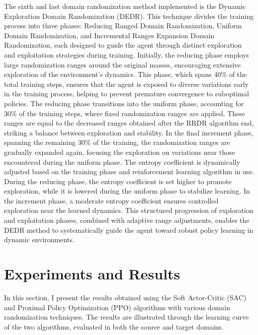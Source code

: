 \documentclass[12pt]{article}
\begin{document}
The sixth and last domain randomization method implemented is the Dynamic Exploration Domain Randomization (DEDR). This technique divides the training process into three phases: Reducing Ranged Domain Randomization, Uniform Domain Randomization, and Incremental Ranges Expansion Domain Randomization, each designed to guide the agent through distinct exploration and exploitation strategies during training. Initially, the reducing phase employs large randomization ranges around the original masses, encouraging extensive exploration of the environment's dynamics. This phase, which spans 40\% of the total training steps, ensures that the agent is exposed to diverse variations early in the training process, helping to prevent premature convergence to suboptimal policies. The reducing phase transitions into the uniform phase, accounting for 30\% of the training steps, where fixed randomization ranges are applied. These ranges are equal to the decreased ranges obtained after the RRDR algorithm end, striking a balance between exploration and stability. In the final increment phase, spanning the remaining 30\% of the training, the randomization ranges are gradually expanded again, focusing the exploration on variations near those encountered during the uniform phase. The entropy coefficient is dynamically adjusted based on the training phase and reinforcement learning algorithm in use. During the reducing phase, the entropy coefficient is set higher to promote exploration, while it is lowered during the uniform phase to stabilize learning. In the increment phase, a moderate entropy coefficient ensures controlled exploration near the learned dynamics. This structured progression of exploration and exploitation phases, combined with adaptive range adjustments, enables the DEDR method to systematically guide the agent toward robust policy learning in dynamic environments.

\section{Experiments and Results}

In this section, I present the results obtained using the Soft Actor-Critic (SAC) and Proximal Policy Optimization (PPO) algorithms with various domain randomization techniques. The results are illustrated through the learning curve of the two algorithms, evaluated in both the source and target domains.
\end{document}
